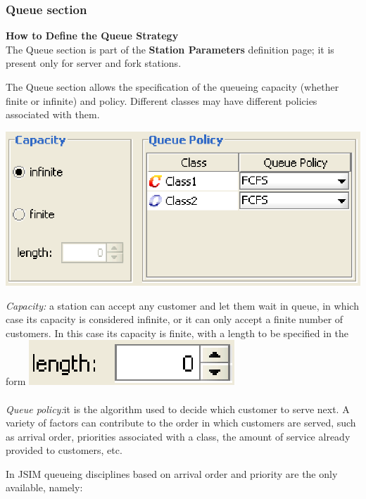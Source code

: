 \subsubsection{Queue section}
\label{sec:QueueSection}
\textbf{How to Define the Queue Strategy}\\
The Queue section is part of the \textbf{Station Parameters} definition page; it is present only for server and fork stations.

The Queue section allows the specification of the queueing capacity (whether finite or infinite) and policy. Different classes may have different policies associated with them.
\begin{center}
\includegraphics[scale=.5]{img/jsim/queue_section1.eps}
\end{center}
\emph{Capacity:} a station can accept any customer and let them
wait in queue, in which case its capacity is considered infinite,
or it can only accept a finite number
of customers. In this case its capacity is finite, with a length to be specified in the form \includegraphics[scale=.5]{img/jsim/lenght.eps}\\\\
\emph{Queue policy:}it is the algorithm used to decide which customer to serve next. A variety of factors can contribute to the order in which customers are served, such as arrival order, priorities associated with a class, the amount of service already provided to customers, etc.

In JSIM queueing disciplines based on arrival order and priority are the only available, namely:

